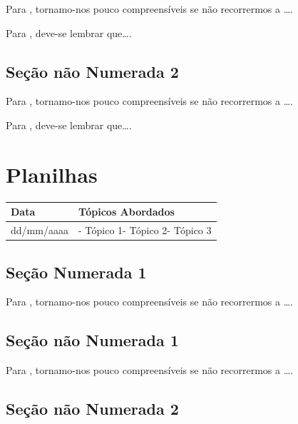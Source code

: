 \documentclass[
]{book}
\begin{document}
Para \citet{BOCK2001}, tornamo-nos pouco compreensíveis se não recorrermos a \ldots.

Para \citet{DAVIDOFF2001}, deve-se lembrar que\ldots.

\hypertarget{seuxe7uxe3o-nuxe3o-numerada-2-41}{%
\subsection*{Seção não Numerada 2}\label{seuxe7uxe3o-nuxe3o-numerada-2-41}}

Para \citet{BOCK2001}, tornamo-nos pouco compreensíveis se não recorrermos a \ldots.

Para \citet{DAVIDOFF2001}, deve-se lembrar que\ldots.

\hypertarget{planilhas}{%
\section{Planilhas}\label{planilhas}}

\begin{longtable}[]{@{}ll@{}}
\toprule()
Data & Tópicos Abordados \\
\midrule()
\endhead
dd/mm/aaaa & - Tópico 1- Tópico 2- Tópico 3 \\
\bottomrule()
\end{longtable}

\hypertarget{seuxe7uxe3o-numerada-1-14}{%
\subsection{Seção Numerada 1}\label{seuxe7uxe3o-numerada-1-14}}

Para \citet{BOCK2001}, tornamo-nos pouco compreensíveis se não recorrermos a \ldots.

\hypertarget{seuxe7uxe3o-nuxe3o-numerada-1-28}{%
\subsection*{Seção não Numerada 1}\label{seuxe7uxe3o-nuxe3o-numerada-1-28}}

Para \citet{BOCK2001}, tornamo-nos pouco compreensíveis se não recorrermos a \ldots.

\hypertarget{seuxe7uxe3o-nuxe3o-numerada-2-42}{%
\subsection*{Seção não Numerada 2}\label{seuxe7uxe3o-nuxe3o-numerada-2-42}}
\end{document}
